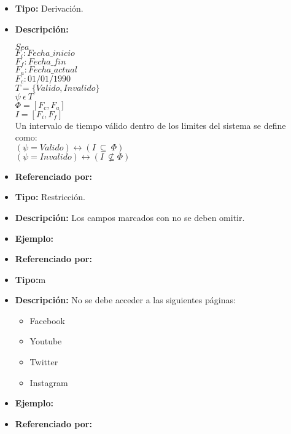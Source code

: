     \begin{itemize}
      \item \textbf{Tipo:} Derivación. 
      \item \textbf{Descripción:} 

      $Sea$\\

      $F_i:Fecha\_inicio$\\
      $F_f:Fecha\_fin$\\
      $F_a:Fecha\_actual$\\
      $F_c:01/01/1990$\\

      $T=\{Valido,Invalido\}$\\
      $\psi\ \epsilon\ T$\\

      $\Phi=[F_c,F_a]$\\
      $I=[F_i,F_f]$\\
      

      Un intervalo de tiempo válido dentro de los limites del sistema se define como:\\

      $(\psi=Valido)\leftrightarrow(I\ \subseteq\ \Phi)$\\
      $(\psi=Invalido)\leftrightarrow(I\ \nsubseteq \Phi)$\\

      \item \textbf{Referenciado por:}  \\
    \end{itemize}


    \begin{itemize}
      \item \textbf{Tipo:} Restricción.  
      \item \textbf{Descripción:} Los campos marcados con \* no se deben omitir.
      \item \textbf{Ejemplo:} 
      \item \textbf{Referenciado por:}  \\
    \end{itemize}

    \begin{itemize}
      \item \textbf{Tipo:}m
      \item \textbf{Descripción:} No se debe acceder a las siguientes páginas:
        \begin{itemize}
            \item Facebook
            \item Youtube
            \item Twitter
            \item Instagram 
        \end{itemize} 
      \item \textbf{Ejemplo:}
      \item \textbf{Referenciado por:}  \\
    \end{itemize}

